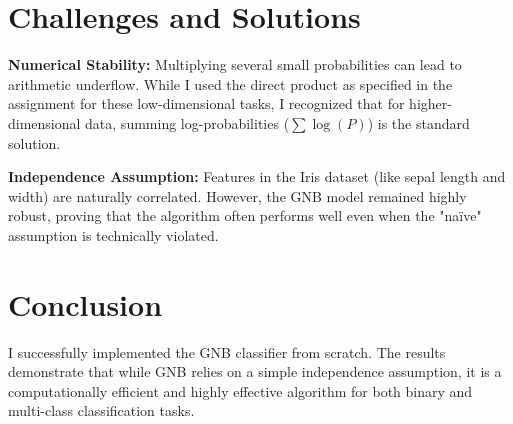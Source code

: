 \documentclass[11pt]{article}
\begin{document}
\section{Challenges and Solutions}
\textbf{Numerical Stability:} Multiplying several small probabilities can lead to arithmetic underflow. While I used the direct product as specified in the assignment for these low-dimensional tasks, I recognized that for higher-dimensional data, summing log-probabilities ($\sum \log(P)$) is the standard solution.

\textbf{Independence Assumption:} Features in the Iris dataset (like sepal length and width) are naturally correlated. However, the GNB model remained highly robust, proving that the algorithm often performs well even when the "naïve" assumption is technically violated.

\section{Conclusion}
I successfully implemented the GNB classifier from scratch. The results demonstrate that while GNB relies on a simple independence assumption, it is a computationally efficient and highly effective algorithm for both binary and multi-class classification tasks.
\end{document}
